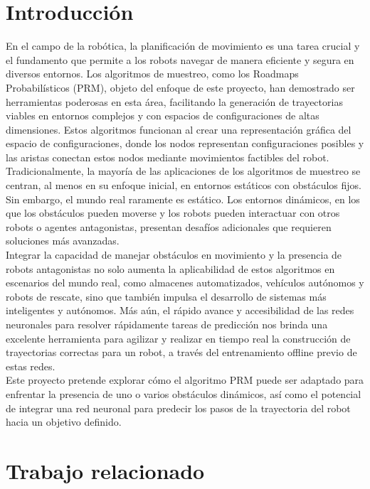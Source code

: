 \documentclass[spanish,mexico]{article}
\numberwithin{equation}{section}
\theoremstyle{definition}
\theoremstyle{remark}
\begin{document}
\newpage
\section{Introducción}
En el campo de la robótica, la planificación de movimiento es una tarea crucial y el fundamento que permite a los robots navegar de manera eficiente y segura en diversos entornos. Los algoritmos de muestreo, como los Roadmaps Probabilísticos (PRM), objeto del enfoque de este proyecto, han demostrado ser herramientas poderosas en esta área, facilitando la generación de trayectorias viables en entornos complejos y con espacios de configuraciones de altas dimensiones. Estos algoritmos funcionan al crear una representación gráfica del espacio de configuraciones, donde los nodos representan configuraciones posibles y las aristas conectan estos nodos mediante movimientos factibles del robot.\\

Tradicionalmente, la mayoría de las aplicaciones de los algoritmos de muestreo se centran, al menos en su enfoque inicial, en entornos estáticos con obstáculos fijos. Sin embargo, el mundo real raramente es estático. Los entornos dinámicos, en los que los obstáculos pueden moverse y los robots pueden interactuar con otros robots o agentes antagonistas, presentan desafíos adicionales que requieren soluciones más avanzadas.\\

Integrar la capacidad de manejar obstáculos en movimiento y la presencia de robots antagonistas no solo aumenta la aplicabilidad de estos algoritmos en escenarios del mundo real, como almacenes automatizados, vehículos autónomos y robots de rescate, sino que también impulsa el desarrollo de sistemas más inteligentes y autónomos. Más aún, el rápido avance y accesibilidad de las redes neuronales para resolver rápidamente tareas de predicción nos brinda una excelente herramienta para agilizar y realizar en tiempo real la construcción de trayectorias correctas para un robot, a través del entrenamiento offline previo de estas redes.\\

Este proyecto pretende explorar cómo el algoritmo PRM puede ser adaptado para enfrentar la presencia de uno o varios obstáculos dinámicos, así como el potencial de integrar una red neuronal para predecir los pasos de la trayectoria del robot hacia un objetivo definido.


\section{Trabajo relacionado}
\end{document}
